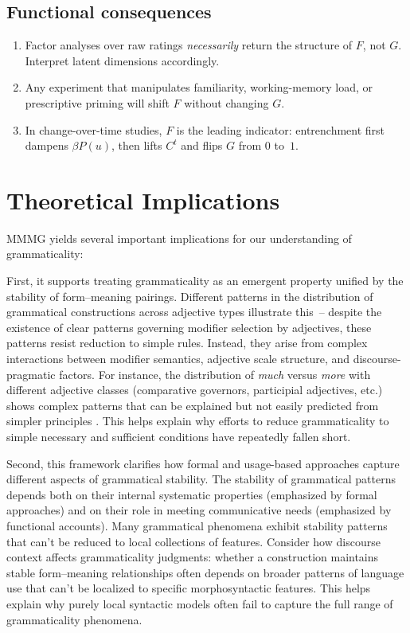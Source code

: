 \documentclass[12pt,letterpaper]{article}
\begin{document}
\subsection{Functional consequences}
\begin{enumerate}
\item Factor analyses over raw ratings \emph{necessarily} return the structure
      of $F$, not $G$.  Interpret latent dimensions accordingly.
\item Any experiment that manipulates familiarity, working-memory load,
      or prescriptive priming will shift $F$ without changing $G$.
\item In change-over-time studies, $F$ is the leading indicator: entrenchment
      first dampens $\beta P(u)$, then lifts $C^t$ and flips $G$ from $0$ to~$1$.
\end{enumerate}



\section{Theoretical Implications}\label{sec:implications}

MMMG yields several important implications for our understanding of grammaticality:

First, it supports treating grammaticality as an emergent property unified by the stability of form--meaning pairings. Different patterns in the distribution of grammatical constructions across adjective types illustrate this~-- despite the existence of clear patterns governing modifier selection by adjectives, these patterns resist reduction to simple rules. Instead, they arise from complex interactions between modifier semantics, adjective scale structure, and discourse-pragmatic factors. For instance, the distribution of \textit{much} versus \textit{more} with different adjective classes (comparative governors, participial adjectives, etc.) shows complex patterns that can be explained but not easily predicted from simpler principles \autocite{reynolds2024why}. This helps explain why efforts to reduce grammaticality to simple necessary and sufficient conditions have repeatedly fallen short.

Second, this framework clarifies how formal and usage-based approaches capture different aspects of grammatical stability. The stability of grammatical patterns depends both on their internal systematic properties (emphasized by formal approaches) and on their role in meeting communicative needs (emphasized by functional accounts). Many grammatical phenomena exhibit stability patterns that can't be reduced to local collections of features. Consider how discourse context affects grammaticality judgments: whether a construction maintains stable form--meaning relationships often depends on broader patterns of language use that can't be localized to specific morphosyntactic features. This helps explain why purely local syntactic models often fail to capture the full range of grammaticality phenomena.
\end{document}
